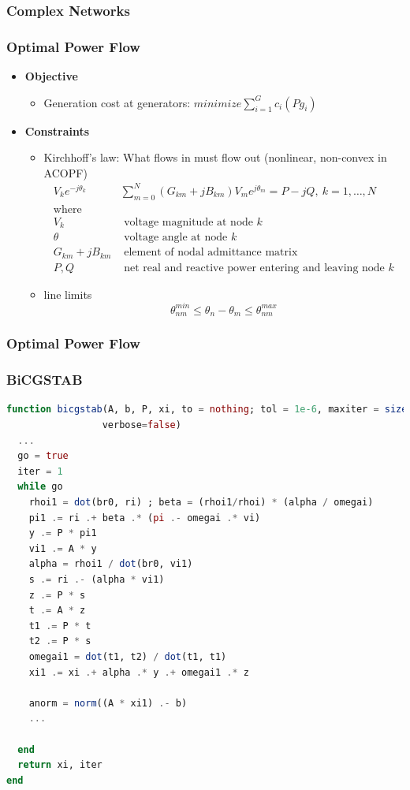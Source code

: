 \begin{frame}
  \frametitle{Complex Networks}
\end{frame}

\begin{frame}[fragile]
  \frametitle{Optimal Power Flow}
  \begin{itemize}
    \item {\bf Objective}
    \begin{itemize}
      \item Generation cost at generators:
      $ minimize \sum^G_{i=1} c_i(Pg_i)$
    \end{itemize}
    \item {\bf Constraints}
    \begin{itemize}
      \item Kirchhoff's law: What flows in must flow out (nonlinear, non-convex in ACOPF)
      \begin{align*}
        V_k e^{-j\theta_k} & \sum^{N}_{m=0} (G_{km} + jB_{km})V_m e^{j\theta_m} = P - jQ,\ k = 1, \dots, N \\
        \text{where}\\
        V_k &\text{ voltage magnitude at node } k\\
        \theta &\text{ voltage angle at node } k\\
        G_{km} + jB_{km}& \text{ element of nodal admittance matrix}\\
        P, Q &\text{ net real and reactive power entering and leaving node } k
      \end{align*}
      \item line limits
      $$ \theta^{min}_{nm} \leq \theta_n - \theta_m \leq \theta^{max}_{nm}$$
    \end{itemize}
  \end{itemize}


\end{frame}

\begin{frame}
  \frametitle{Optimal Power Flow}
  
\end{frame}

\begin{frame}[fragile]
  \frametitle{BiCGSTAB}
  \begin{lstlisting}[language=julia, style=jlcodestyle]
function bicgstab(A, b, P, xi, to = nothing; tol = 1e-6, maxiter = size(A,1),
                 verbose=false)
  ...
  go = true
  iter = 1
  while go
    rhoi1 = dot(br0, ri) ; beta = (rhoi1/rhoi) * (alpha / omegai)
    pi1 .= ri .+ beta .* (pi .- omegai .* vi)
    y .= P * pi1
    vi1 .= A * y
    alpha = rhoi1 / dot(br0, vi1)
    s .= ri .- (alpha * vi1)
    z .= P * s
    t .= A * z
    t1 .= P * t
    t2 .= P * s
    omegai1 = dot(t1, t2) / dot(t1, t1)
    xi1 .= xi .+ alpha .* y .+ omegai1 .* z
  
    anorm = norm((A * xi1) .- b)
    ...

  end
  return xi, iter
end
  \end{lstlisting}
\end{frame}


